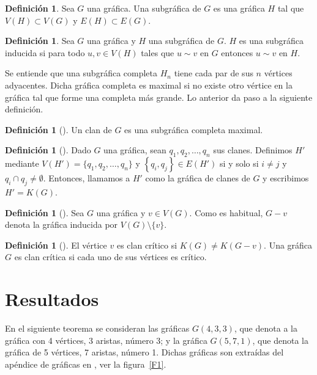 \documentclass[12pt]{book}
\theoremstyle{definition}
\newtheorem{definition}[theorem]{Definición}
\begin{document}
\begin{definition}
Sea $G$ una gráfica. Una subgráfica de $G$ es una gráfica $H$ tal que $V(H)\subset V(G)$ y $E(H)\subset E(G)$.
\end{definition}

\begin{definition}
Sea $G$ una gráfica y $H$ una subgráfica de $G$. $H$ es una subgráfica inducida si para todo $u,v\in V(H)$ tales que $u\sim v$ en $G$ entonces $u\sim v$ en $H$.
\end{definition}

Se entiende que una subgráfica completa $H_n$ tiene cada par de sus $n$ vértices adyacentes. Dicha gráfica completa es maximal si no existe otro vértice en la gráfica tal que forme una completa más grande. Lo anterior da paso a la siguiente definición.

\begin{definition}[\citealt{Harary:1969}]
Un clan de $G$ es una subgráfica completa maximal. 
\end{definition}

\begin{definition}[\citealt{Roberts:1971}]
Dado $G$ una gráfica, sean $q_1, q_2, \dots, q_n $ sus clanes. Definimos $H'$ mediante $ V(H') = \{q_1, q_2, \dots, q_n\}$ y $\left\{q_i, q_j\right\}\in E(H')$ si y solo si $i \neq j$ y $q_i \cap q_j \neq \emptyset$.  
Entonces, llamamos a $H'$ como la gráfica de clanes de $G$ y escribimos $H'=K(G)$.
\end{definition}

\begin{definition}[\citealt{Alcon:2006}]
Sea $G$ una gráfica y $v \in V(G)$. Como es habitual, $G-v$ denota la gráfica inducida por $V(G)\setminus \{v\}$.  
\end{definition}

\begin{definition}[\citealt{Escalante:1974}]
El vértice $v$ es clan crítico si $K(G)\neq K(G-v)$. Una gráfica $G$ es clan crítica si cada uno de sus vértices es crítico.
\end{definition}



\section{Resultados}

En el siguiente teorema se consideran las gráficas $G(4,3,3)$, que denota a la gráfica con 4 vértices, 3 aristas, número 3; y la gráfica $G(5,7,1)$, que denota la gráfica de 5 vértices, 7 aristas, número 1. Dichas gráficas son extraídas del apéndice de gráficas en \cite{Harary:1969}, ver la figura~\ref{F1}.
\end{document}
